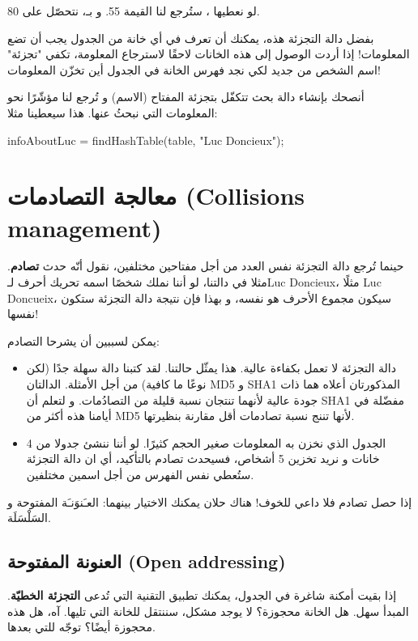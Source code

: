 لو نعطيها
،
ستُرجع لنا القيمة 55. و بـ،
نتحصّل على 80.

بفضل دالة التجزئة هذه، يمكنك أن تعرف في أي خانة من الجدول يجب أن تضع المعلومات! إذا أردت الوصول إلى هذه الخانات لاحقًا لاسترجاع المعلومة، تكفي "تجزئة" اسم الشخص من جديد لكي نجد فهرس الخانة في الجدول أين تخزّن المعلومات!

أنصحك بإنشاء دالة بحث تتكفّل بتجزئة المفتاح (الاسم) و تُرجع لنا مؤشّرًا نحو المعلومات التي نبحثُ عنها. هذا سيعطينا مثلا:

\begin{Csource}
infoAboutLuc = findHashTable(table, "Luc Doncieux");
\end{Csource}

\section{معالجة التصادمات (\textenglish{Collisions management})}

حينما تُرجع دالة التجزئة نفس العدد من أجل مفتاحين مختلفين، نقول أنّه حدث 
\textbf{تصادم}.
مثلا في دالتنا، لو أننا نملك شخصًا اسمه تحريك أحرف لـ\textenglish{Luc Doncieux}،
مثلًا
\textenglish{Luc Doncueix}،
سيكون مجموع الأحرف هو نفسه، و بهذا فإن نتيجة دالة التجزئة ستكون نفسها!

يمكن لسببين أن يشرحا التصادم:

\begin{itemize}
	\item دالة التجزئة لا تعمل بكفاءة عالية. هذا يمثّل حالتنا. لقد كتبنا دالة سهلة جدًا (لكن نوعًا ما كافية) من أجل الأمثلة. الدالتان 
	\textenglish{MD5}
	و
	\textenglish{SHA1}
	المذكورتان أعلاه هما ذات جودة عالية لأنهما تنتجان نسبة قليلة من التصادُمات. و لتعلم أن 
	\textenglish{SHA1}
	مفضّلة في أيامنا هذه أكثر من
	\textenglish{MD5}
	لأنها تننج نسبة تصادمات أقل مقارنة بنظيرتها.
	
	\item الجدول الذي نخزن به المعلومات صغير الحجم كثيرًا. لو أننا ننشئ جدولا من 4 خانات و نريد تخزين 5 أشخاص، فسيحدث تصادم بالتأكيد، أي ان دالة التجزئة ستُعطي نفس الفهرس من أجل اسمين مختلفين.
\end{itemize}

إذا حصل تصادم فلا داعي للخوف! هناك حلان يمكنك الاختيار بينهما: العـَنوَنـَة المفتوحة و السَلْسَلَة.


\subsection{العنونة المفتوحة (\textenglish{Open addressing})}
إذا بقيت أمكنة شاغرة في الجدول، يمكنك تطبيق التقنية التي تُدعى 
\textbf{التجزئة الخطيّة}.
المبدأ سهل. هل الخانة محجوزة؟ لا يوجد مشكل، سننتقل للخانة التي تليها. آه، هل هذه محجوزة أيضًا؟ توجّه للتي بعدها.

